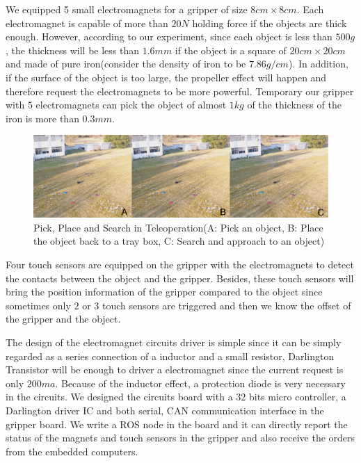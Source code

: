 \documentclass{standalone}
\begin{document}
We equipped 5 small electromagnets for a gripper of size $8cm \times 8cm$. Each electromagnet is capable of more than $20 N$ holding force if the objects are thick enough. However, according to our experiment, since each object is less than $500 g$, the thickness will be less than $1.6 mm$ if the object is a square of $20cm \times 20cm$ and made of pure iron(consider the density of iron to be $7.86 g/cm$). In addition, if the surface of the object is too large, the propeller effect will happen and therefore request the electromagnets to be more powerful. Temporary our gripper with $5$ electromagnets can pick the object of almost $1kg$ of the thickness of the iron is more than $0.3mm$. 
 \begin{figure}%
    \begin{center}
    \includegraphics[keepaspectratio=true, width=1\linewidth, height=0.3\textheight]
    {sections//task3//images//teleop.png}
      \end{center}
    \caption{Pick, Place and Search in Teleoperation(A: Pick an object, B: Place the object back to a tray box, C: Search and approach to an object)}
    \label{task3tele}
    \end{figure}

Four touch sensors are equipped on the gripper with the electromagnets to detect the contacts between the object and the gripper. Besides, these touch sensors will bring the position information of the gripper compared to the object since sometimes only $2$ or $3$ touch sensors are triggered and then we know the offset of the gripper and the object. 
    
The design of the electromagnet circuits driver is simple since it can be simply regarded as a series connection of a inductor and a small resistor, Darlington Transistor will be enough to driver a electromagnet since the current request is only $200 ma$. Because of the inductor effect, a protection diode is very necessary in the circuits. We designed the circuits board with a $32$ bits micro controller, a Darlington driver IC and both serial, CAN communication interface in the gripper board. We write a ROS node in the board and it can directly report the status of the magnets and touch sensors in the gripper and also receive the orders from the embedded computers. 
\end{document}
